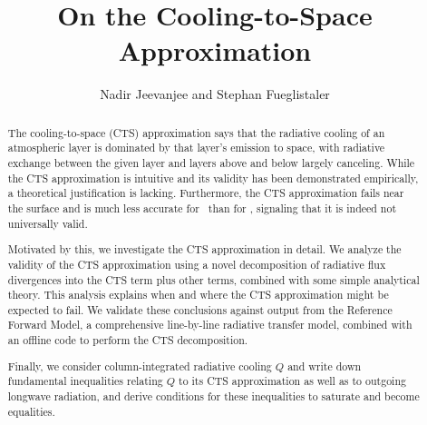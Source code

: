 \documentclass[10pt]{article}
\begin{document}
%
%


\title{On the Cooling-to-Space Approximation}

%
%


 \author{Nadir Jeevanjee and Stephan Fueglistaler}

\maketitle

\begin{abstract}
The cooling-to-space (CTS) approximation says that the radiative cooling of an atmospheric layer is dominated by that layer's emission to space, with radiative exchange between the given layer and layers above and below largely canceling. While the CTS approximation is intuitive and its validity  has been demonstrated empirically, a theoretical justification is lacking. Furthermore, the CTS approximation fails near the surface and is much less accurate for \cotwo\ than for \htwo, signaling that it is indeed not universally valid.

Motivated by this, we investigate the CTS approximation in detail. We analyze the validity of the CTS approximation using a novel decomposition of radiative flux divergences into the CTS term plus other terms,  combined  with some simple analytical theory. This analysis explains when and where the CTS approximation might be expected to fail. We validate these  conclusions against output from the Reference Forward Model, a comprehensive line-by-line radiative transfer model, combined with an offline code to perform the CTS decomposition.

Finally, we consider column-integrated radiative cooling $Q$ and write down fundamental inequalities relating $Q$ to its CTS approximation as well as to outgoing longwave radiation, and derive conditions for these inequalities to saturate and become equalities.


%
%
\end{abstract}


%
%
\end{document}
